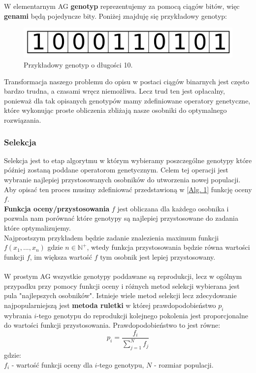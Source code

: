 \documentclass{article}
\begin{document}
W elementarnym AG \textbf{genotyp} reprezentujemy za pomocą ciągów bitów, więc \textbf{genami}
będą pojedyncze bity.
Poniżej znajduję się przykładowy genotyp:\\

\begin{figure}[H]
\centering
\includegraphics[scale=0.20]{genome_v2.png}
\caption{Przykładowy genotyp o długości 10.}
\end{figure}

Transformacja naszego problemu do opisu w postaci ciągów binarnych jest często bardzo trudna, a
czasami wręcz niemożliwa. Lecz trud ten jest opłacalny, ponieważ dla tak opisanych genotypów mamy
zdefiniowane operatory genetyczne, które wykonując proste obliczenia zbliżają nasze osobniki do
optymalnego rozwiązania.

\subsubsection{Selekcja}
Selekcja jest to etap algorytmu w którym wybieramy poszczególne genotypy które później zostaną 
poddane operatorom genetycznym. Celem tej operacji jest wybranie najlepiej przystosowanych
osobników do utworzenia nowej populacji.
Aby opisać ten proces musimy zdefiniować przedstawioną w [\hyperref[alg:ag]{Alg. 1}]
funkcję oceny $f$.\\
\textbf{Funkcja oceny/przystosowania} $f$ jest obliczana dla każdego osobnika i pozwala nam
porównać które genotypy są najlepiej przystosowane do zadania które optymalizujemy.\\
Najprostszym przykładem będzie zadanie znalezienia maximum funkcji 
$f(x_1, ..., x_n)$ gdzie $n \in \mathbb{N}^{+}$, wtedy funkcja przystosowania
będzie równa wartości funkcji $f$, im większa wartość $f$ tym osobnik jest
lepiej przystosowany.\\\\
W prostym AG wszystkie genotypy poddawane są reprodukcji, lecz w ogólnym przypadku przy pomocy
funkcji oceny i różnych metod selekcji wybierana jest pula "najlepszych osobników".
Istnieje wiele metod selekcji lecz zdecydowanie najpopularniejszą jest \textbf{metoda ruletki}
w której prawdopodobieństwo $p_i$
wybrania $i$-tego genotypu do reprodukcji kolejnego pokolenia jest proporcjonalne do wartości
funkcji przystosowania. Prawdopodobieństwo to jest równe:\\
\begin{equation}
	p_i = \frac{f_i}{\sum_{j=1}^{N} f_j}
\end{equation}
gdzie:\\
$f_i$ - wartość funkcji oceny dla $i$-tego genotypu, $N$ - rozmiar populacji.\\
\end{document}
